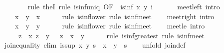 \begin{isabellebody}
\ \ \ \ \ \ \isamarkupfalse%
\ {\isacharparenleft}rule\ theI{\isacharparenright}\ {\isacharparenleft}rule\ is{\isacharunderscore}inf{\isacharunderscore}uniq\ {\isacharbrackleft}OF\ {\isacharunderscore}\ {\isacharbackquoteopen}is{\isacharunderscore}inf\ x\ y\ i{\isacharbackquoteclose}{\isacharbrackright}{\isacharparenright}\isanewline
\ \ \isamarkupfalse%
\isanewline
\isanewline
\ \ \isamarkupfalse%
\ meet{\isacharunderscore}left\ {\isacharbrackleft}intro{\isacharquery}{\isacharbrackright}{\isacharcolon}\isanewline
\ \ \ \ {\isachardoublequoteopen}x\ {\isasymsqinter}\ y\ {\isasymsqsubseteq}\ x{\isachardoublequoteclose}\isanewline
\ \ \ \ \isamarkupfalse%
\ {\isacharparenleft}rule\ is{\isacharunderscore}inf{\isacharunderscore}lower{\isacharparenright}\ {\isacharparenleft}rule\ is{\isacharunderscore}inf{\isacharunderscore}meet{\isacharparenright}\isanewline
\isanewline
\ \ \isamarkupfalse%
\ meet{\isacharunderscore}right\ {\isacharbrackleft}intro{\isacharquery}{\isacharbrackright}{\isacharcolon}\isanewline
\ \ \ \ {\isachardoublequoteopen}x\ {\isasymsqinter}\ y\ {\isasymsqsubseteq}\ y{\isachardoublequoteclose}\isanewline
\ \ \ \ \isamarkupfalse%
\ {\isacharparenleft}rule\ is{\isacharunderscore}inf{\isacharunderscore}lower{\isacharparenright}\ {\isacharparenleft}rule\ is{\isacharunderscore}inf{\isacharunderscore}meet{\isacharparenright}\isanewline
\isanewline
\ \ \isamarkupfalse%
\ meet{\isacharunderscore}le\ {\isacharbrackleft}intro{\isacharquery}{\isacharbrackright}{\isacharcolon}\isanewline
\ \ \ \ {\isachardoublequoteopen}{\isasymlbrakk}\ z\ {\isasymsqsubseteq}\ x{\isacharsemicolon}\ z\ {\isasymsqsubseteq}\ y\ {\isasymrbrakk}\ {\isasymLongrightarrow}\ z\ {\isasymsqsubseteq}\ x\ {\isasymsqinter}\ y{\isachardoublequoteclose}\isanewline
\ \ \ \ \isamarkupfalse%
\ {\isacharparenleft}rule\ is{\isacharunderscore}inf{\isacharunderscore}greatest{\isacharparenright}\ {\isacharparenleft}rule\ is{\isacharunderscore}inf{\isacharunderscore}meet{\isacharparenright}\isanewline
\isanewline
\ \ \isamarkupfalse%
\ join{\isacharunderscore}equality\ {\isacharbrackleft}elim{\isacharquery}{\isacharbrackright}{\isacharcolon}\ {\isachardoublequoteopen}is{\isacharunderscore}sup\ x\ y\ s\ {\isasymLongrightarrow}\ x\ {\isasymsqunion}\ y\ {\isacharequal}\ s{\isachardoublequoteclose}\isanewline
\ \ \isamarkupfalse%
\ {\isacharparenleft}unfold\ join{\isacharunderscore}def{\isacharparenright}\isanewline
\ \ \ \ \isamarkupfalse%

\end{isabellebody}
